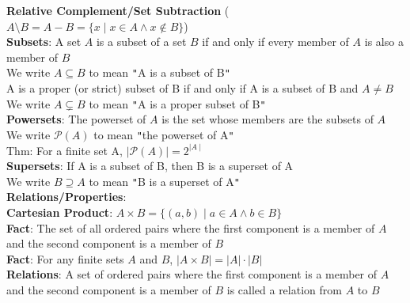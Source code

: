 \documentclass{article}
\begin{document}
		\indent{\hspace{\parindent}}\textbf{Relative Complement/Set Subtraction} ($A \setminus B = A - B = \{ x \mid x \in A \land x \notin B \}$) \\
	\indent{}\textbf{Subsets}: A set $A$ is a subset of a set $B$ if and only if every member of $A$ is also a member of $B$ \\
		\indent{\hspace{\parindent}}We write $A \subseteq B$ to mean \verb|"|A is a subset of B\verb|"| \\
		\indent{\hspace{\parindent}}A is a proper (or strict) subset of B if and only if A is a subset of B and $A \neq B$ \\
		\indent{\hspace{\parindent}}We write $A \subsetneq B$ to mean \verb|"|A is a proper subset of B\verb|"| \\
	\indent{}\textbf{Powersets}: The powerset of $A$ is the set whose members are the subsets of $A$ \\
		\indent{\hspace{\parindent}}We write $\mathcal{P} (A)$ to mean \verb|"|the powerset of A\verb|"| \\
		\indent{\hspace{\parindent}}Thm: For a finite set A, $\mid \mathcal{P} (A) \mid = 2^{\mid A \mid}$ \\
	\indent{}\textbf{Supersets}: If A is a subset of B, then B is a superset of A \\
		\indent{\hspace{\parindent}}We write $B \supseteq A$ to mean \verb|"|B is a superset of A\verb|"| \\
\textbf{Relations/Properties}: \\
	\indent{}\textbf{Cartesian Product}: $A \times B = \{(a,b) \mid a \in A \land b \in B\}$ \\
		\indent{\hspace{\parindent}}\textbf{Fact}: The set of all ordered pairs where the first component is a member of $A$ and the second component is a member of $B$ \\
		\indent{\hspace{\parindent}}\textbf{Fact}: For any finite sets $A$ and $B$, $\mid A \times B \mid = |A| \cdot |B|$ \\
	\indent{}\textbf{Relations}: A set of ordered pairs where the first component is a member of $A$ and the second component is a member of $B$ is called a relation from $A$ to $B$ \\
\end{document}
